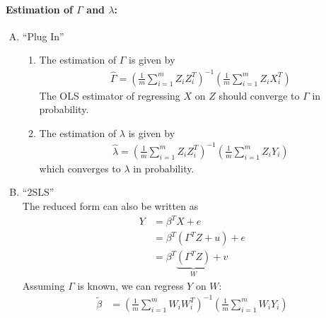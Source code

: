 \documentclass[11pt]{elegantbook}
\begin{document}
\paragraph*{Estimation of $\Gamma$ and $\lambda$:}
\begin{enumerate}[(A).]
    \item ``Plug In''
    \begin{enumerate}
        \item The estimation of $\Gamma$ is given by
        \begin{equation}
            \begin{aligned}
                \hat{\Gamma}=\left(\frac{1}{m}\sum_{i=1}^m Z_iZ_i^T\right)^{-1}\left(\frac{1}{m}\sum_{i=1}^m Z_i X_i^T\right)
            \end{aligned}
            \tag{hG}
        \end{equation}
        The OLS estimator of regressing $X$ on $Z$ should converge to $\Gamma$ in probability.
        \item The estimation of $\lambda$ is given by
        \begin{equation}
            \begin{aligned}
                \hat{\lambda}=\left(\frac{1}{m}\sum_{i=1}^m Z_iZ_i^T\right)^{-1}\left(\frac{1}{m}\sum_{i=1}^m Z_i Y_i\right)
            \end{aligned}
            \nonumber
            \label{hG}
        \end{equation}
        which converges to $\lambda$ in probability.
    \end{enumerate}
    \item ``2SLS''\\
    The reduced form can also be written as
    \begin{equation}
        \begin{aligned}
            Y&=\beta^TX+e\\
            &=\beta^T(\Gamma^TZ+u)+e\\
            &=\beta^T\underbrace{(\Gamma^TZ)}_{W} +v
        \end{aligned}
        \tag{hl}
        \label{hl}
    \end{equation}
    Assuming $\Gamma$ is known, we can regress $Y$ on $W$:
    \begin{equation}
        \begin{aligned}
            \tilde{\beta}&=\left(\frac{1}{m}\sum_{i=1}^m W_iW_i^T\right)^{-1}\left(\frac{1}{m}\sum_{i=1}^m W_i Y_i\right)\\

\end{aligned}
\end{equation}
\end{enumerate}
\end{document}
